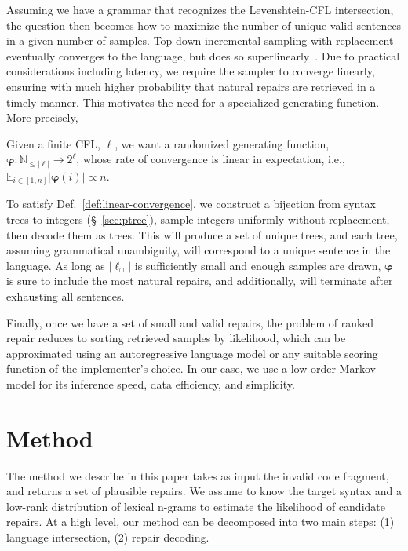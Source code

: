 \documentclass[sigplan,review,acmsmall,nonacm,anonymous]{acmart}\settopmatter{printfolios=false,printccs=false,printacmref=false}
\begin{document}
  Assuming we have a grammar that recognizes the Levenshtein-CFL intersection, the question then becomes how to maximize the number of unique valid sentences in a given number of samples. Top-down incremental sampling with replacement eventually converges to the language, but does so superlinearly~\cite{flajolet1992birthday}. Due to practical considerations including latency, we require the sampler to converge linearly, ensuring with much higher probability that natural repairs are retrieved in a timely manner. This motivates the need for a specialized generating function. More precisely,

  \begin{definition}\label{def:linear-convergence}
    Given a finite CFL, $\ell$, we want a randomized generating function, $\bm{\varphi}: \mathbb{N}_{\leq|\ell|} \rightarrow 2^\ell$, whose rate of convergence is linear in expectation, i.e., $\mathbb{E}_{i \in [1, n]}|\bm{\varphi}(i)| \propto n$.
  \end{definition}

  To satisfy Def.~\ref{def:linear-convergence}, we construct a bijection from syntax trees to integers (\S~\ref{sec:ptree}), sample integers uniformly without replacement, then decode them as trees. This will produce a set of unique trees, and each tree, assuming grammatical unambiguity, will correspond to a unique sentence in the language. As long as $|\ell_\cap|$ is sufficiently small and enough samples are drawn, $\bm\varphi$ is sure to include the most natural repairs, and additionally, will terminate after exhausting all sentences.

  Finally, once we have a set of small and valid repairs, the problem of ranked repair reduces to sorting retrieved samples by likelihood, which can be approximated using an autoregressive language model or any suitable scoring function of the implementer's choice. In our case, we use a low-order Markov model for its inference speed, data efficiency, and simplicity.

  \clearpage\section{Method}

  The method we describe in this paper takes as input the invalid code fragment, and returns a set of plausible repairs. We assume to know the target syntax and a low-rank distribution of lexical n-grams to estimate the likelihood of candidate repairs. At a high level, our method can be decomposed into two main steps: (1) language intersection, (2) repair decoding.
\end{document}

